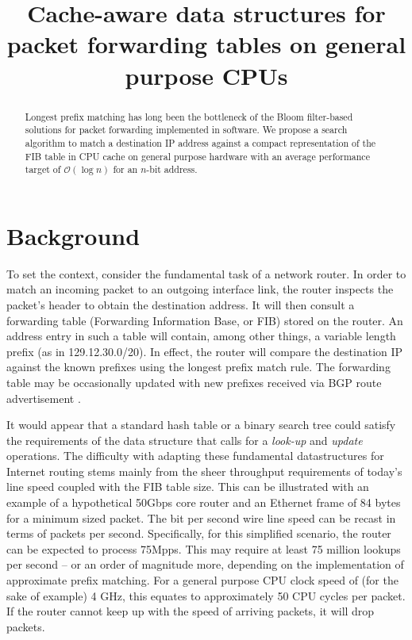 \documentclass[conference,compsoc]{IEEEtran}
\begin{document}
\title{Cache-aware data structures for packet forwarding tables on general purpose CPUs}
\author{
}

\maketitle

\begin{abstract}
Longest prefix matching has long been the bottleneck of the Bloom
filter-based solutions for packet forwarding implemented in software.
We propose a search algorithm to match a destination IP address against a
compact representation of the FIB table in CPU cache on general purpose
hardware with an average performance target of
$\mathcal{O}(\log n)$ for an $n$-bit address.

\end{abstract}

\section{Background}
To set the context, consider the fundamental task of a network router.
In order to match an incoming packet to an outgoing interface link,
the router inspects the packet's header to obtain the destination address.
It will then consult a forwarding table (Forwarding Information Base, 
or FIB) stored on the router.
An address entry in such a table will contain, among other things,
a variable length prefix (as in 129.12.30.0/20).
In effect, the router will compare the destination IP
against the known prefixes using the longest prefix match rule.
The forwarding table may be occasionally updated with new prefixes
received via BGP route advertisement \cite{Kurose:Networking}.

It would appear that a standard hash table or a binary search tree could
satisfy the requirements of the data structure that calls for a
\textit{look-up} and \textit{update} operations. The difficulty with
adapting these fundamental datastructures for Internet routing stems 
mainly from the sheer throughput requirements of today's line speed coupled
with the FIB table size.
This can be illustrated with an example of a hypothetical 50Gbps core router 
and an Ethernet frame of 84 bytes for a minimum sized packet.
The bit per second
wire line speed can be recast in terms of packets per second. Specifically,
for this simplified scenario, the router can be expected to process 75Mpps. 
This may require at least 75 million lookups per second -- or an order of
magnitude more, depending on the implementation of approximate prefix
matching.
For a general purpose CPU clock
speed of (for the sake of example) 4 GHz, this equates to approximately 
50 CPU cycles per packet. If the router cannot keep up with the speed of
arriving packets, it will drop packets.
\end{document}
